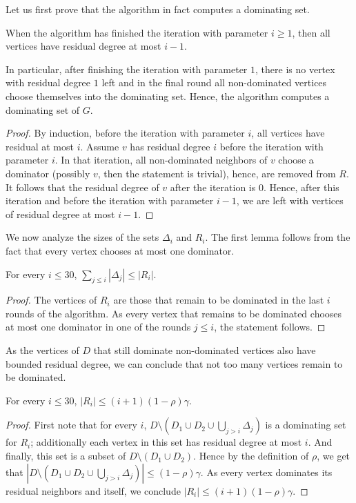 \smallskip
Let us first prove that the algorithm in fact computes a dominating set.
\begin{lemma}\label{lem:correctness}
  When the algorithm has finished the iteration with parameter
  $i\geq 1$, then all vertices have residual degree at most $i-1$.
\end{lemma}

In particular, after finishing the iteration with parameter $1$, there
is no vertex with residual degree $1$ left and in the final round all
non-dominated vertices choose themselves into the dominating
set. Hence, the algorithm computes a dominating set of $G$.

\begin{proof}
  By induction, before the iteration with parameter $i$, all vertices
  have residual at most $i$. Assume $v$ has residual degree $i$ before
  the iteration with parameter $i$.  In that iteration, all
  non-dominated neighbors of $v$ choose a dominator (possibly $v$, then
  the statement is trivial),
  hence, are removed from $R$. It follows that the residual degree of $v$ after
  the iteration is $0$. Hence, after this iteration and before the
  iteration with parameter $i-1$, we are left with vertices of
  residual degree at most $i-1$.
\end{proof}

We now analyze the sizes of the sets $\Delta_i$ and $R_i$. The first
lemma follows from the fact that every vertex chooses at most one
dominator.

\begin{lemma}\label{lem:total-h}
  For every $i\le 30$, $\sum\limits_{j\le i}|\Delta_j| \le |R_i|$.
\end{lemma}
\begin{proof}
  The vertices of $R_i$ are those that remain to be dominated in the
  last $i$ rounds of the algorithm. As every vertex that remains to be
  dominated chooses at most one dominator in one of the rounds
  $j\leq i$, the statement follows.
\end{proof}

As the vertices of $D$ that still dominate non-dominated vertices also
have bounded residual degree, we can conclude that not too many
vertices remain to be dominated.
\begin{lemma}\label{lem:h1}
  For every $i\le 30$, $|R_i| \le (i+1)(1-\rho)\gamma$.
\end{lemma}
\begin{proof}
  First note that for every $i$,
  $D\setminus (D_1\cup D_2\cup \bigcup_{j>i}\Delta_j)$ is a dominating
  set for $R_i$; additionally each vertex in this set has residual
  degree at most $i$.  And finally, this set is a subset of
  $D\setminus (D_1\cup D_2)$. Hence by the definition of $\rho$, we get
  that
  $|D\setminus (D_1\cup D_2\cup \bigcup_{j>i}\Delta_j)|\le
  (1-\rho)\gamma$. As every vertex dominates its residual neighbors and
  itself, we conclude $|R_i|\le (i+1)(1-\rho)\gamma$.
\end{proof}

